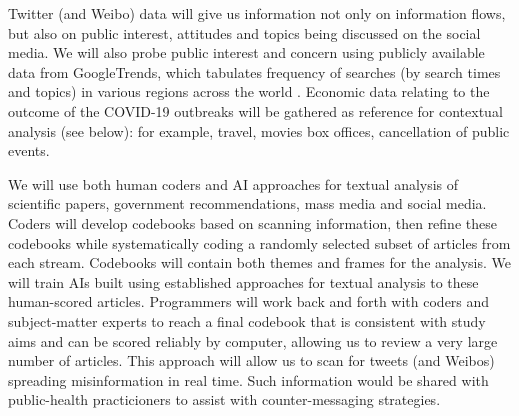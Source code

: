 Twitter (and Weibo)  data will give us information not only on information flows, but also on public interest, attitudes and topics being discussed on the social media. We will also probe public interest and concern using publicly available data from GoogleTrends, which tabulates frequency of searches (by search times and topics) in various regions across the world \cite{BousAgac17, MahrBrag19}.
Economic data relating to the outcome of the COVID-19 outbreaks will be gathered as reference for contextual analysis (see below): for example, travel, movies box offices, cancellation of public events.



We will use both human coders and AI approaches for textual analysis of scientific papers, government recommendations, mass media and social media. Coders will develop codebooks based on scanning information, then refine these codebooks while systematically coding a randomly selected subset of articles from each stream. Codebooks will contain both themes and frames for the analysis.  We will train AIs built using established approaches for textual analysis to these human-scored articles. Programmers will work back and forth with coders and subject-matter experts to reach a final codebook that is consistent with study aims and can be scored reliably by computer, allowing us to review a very large number of articles.  
This approach will allow us to scan for tweets (and Weibos) spreading misinformation in real time. Such information would be shared with public-health practicioners to assist with counter-messaging strategies.



